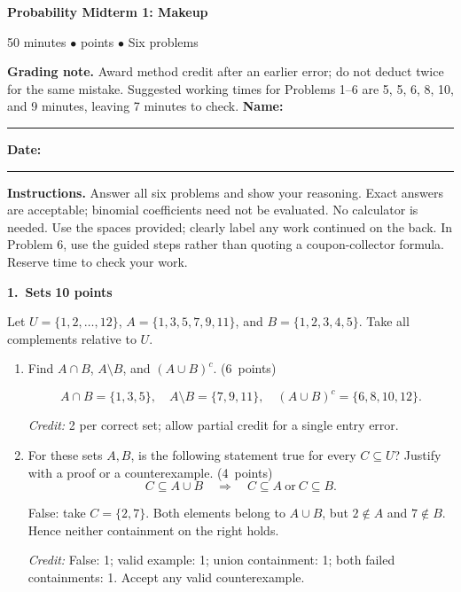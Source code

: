 \documentclass[11pt,letterpaper]{article}
\newcommand{\partpts}[1]{\unskip\nobreak\hspace{.3em}%
  \mbox{\small\color{muted}(#1 points)}}
\newcommand{\credit}[1]{\par{\footnotesize\color{muted}\textit{Credit:} #1}}
\newcommand{\problem}[3]{\par\addvspace{9pt}%
  {\large\bfseries\color{indigo}#1.\ #2}\hfill
  {\small\color{muted}\textbf{#3 points}}\par\nobreak}
\begin{document}
{\LARGE\bfseries\color{indigo}Probability Midterm 1: Makeup}\par
{\small\color{muted}50 minutes \quad $\bullet$  points
  \quad $\bullet$ \quad Six problems}\par
\ifanswers
\textbf{Grading note.} Award method credit after an earlier error; do not
deduct twice for the same mistake. Suggested working times for Problems
1--6 are 5, 5, 6, 8, 10, and 9 minutes, leaving 7 minutes to check.
\else
\smallskip
\textbf{Name:}\ \rule{.49\linewidth}{.4pt}\hfill
\textbf{Date:}\ \rule{.20\linewidth}{.4pt}\par
\fi
\textbf{Instructions.} Answer all six problems and show your reasoning.
Exact answers are acceptable; binomial coefficients need not be evaluated.
No calculator is needed. Use the spaces provided; clearly label any work
continued on the back. In Problem 6, use the guided steps rather than
quoting a coupon-collector formula. Reserve time to check your work.

\problem{1}{Sets}{10}
Let $U=\{1,2,\ldots,12\}$, $A=\{1,3,5,7,9,11\}$, and
$B=\{1,2,3,4,5\}$. Take all complements relative to $U$.
\begin{enumerate}
\item Find $A\cap B$, $A\setminus B$, and $(A\cup B)^c$. \partpts{6}
\begin{solution}[.85in]
\[
A\cap B=\{1,3,5\},\quad A\setminus B=\{7,9,11\},\quad
(A\cup B)^c=\{6,8,10,12\}.
\]
\credit{2 per correct set; allow partial credit for a single entry error.}
\end{solution}
\item For these sets $A,B$, is the following statement true for every
$C\subseteq U$? Justify with a proof or a counterexample. \partpts{4}
\[
C\subseteq A\cup B\quad\Longrightarrow\quad
C\subseteq A\ \text{or}\ C\subseteq B.
\]
\begin{solution}[.85in]
False: take $C=\{2,7\}$. Both elements belong to $A\cup B$, but
$2\notin A$ and $7\notin B$. Hence neither containment on the right holds.
\credit{False: 1; valid example: 1; union containment: 1;
both failed containments: 1. Accept any valid counterexample.}
\end{solution}
\end{enumerate}
\end{document}
